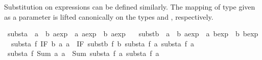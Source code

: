 \begin{isabellebody}
\begin{isamarkuptext}
  \medskip Substitution on expressions can be defined similarly.  The
  mapping  of type  given as a
  parameter is lifted canonically on the types  and
  , respectively.%
\end{isamarkuptext}%
\isamarkuptrue%
\isamarkupfalse%
\ substa\ {}{}\ {}{}{}a\ {}\ {}b\ aexp{}\ {}\ {}a\ aexp\ {}\ {}b\ aexp{}\isanewline
\ \ \ substb\ {}{}\ {}{}{}a\ {}\ {}b\ aexp{}\ {}\ {}a\ bexp\ {}\ {}b\ bexp{}\isanewline
{}\isanewline
\ \ {}substa\ f\ {}IF\ b\ a{}\ a{}{}\ {}\ IF\ {}substb\ f\ b{}\ {}substa\ f\ a{}{}\ {}substa\ f\ a{}{}{}\isanewline
{}\ {}substa\ f\ {}Sum\ a{}\ a{}{}\ {}\ Sum\ {}substa\ f\ a{}{}\ {}substa\ f\ a{}{}{}\isanewline

\end{isabellebody}
